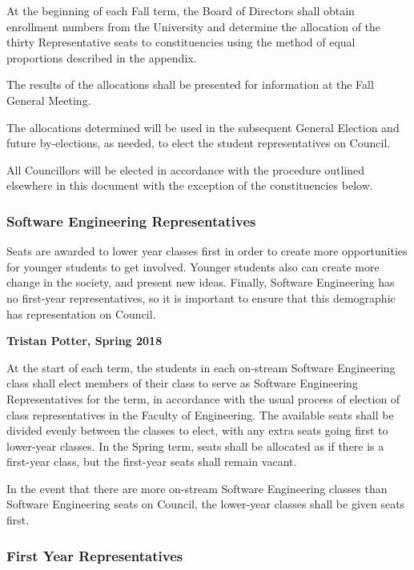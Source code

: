 At the beginning of each Fall term, the Board of Directors shall obtain 
enrollment numbers from the University and determine the allocation of the
thirty Representative seats to constituencies using the method of equal
proportions described in the appendix.

The results of the allocations shall be presented for information at the 
Fall General Meeting.

The allocations determined will be used in the subsequent General Election and
future by-elections, as needed, to elect the student representatives on
Council. 

All Councillors will be elected in accordance with the procedure outlined
elsewhere in this document with the exception of the constituencies below.

\subsubsection{Software Engineering Representatives}
\begin{annotation}
    Seats are awarded to lower year classes first in order to create more
    opportunities for younger students to get involved. Younger students also
    can create more change in the society, and present new ideas. Finally,
    Software Engineering has no first-year representatives, so it is important
    to ensure that this demographic has representation on Council.
    
    \textbf{Tristan Potter, Spring 2018}
\end{annotation}

At the start of each term, the students in each on-stream Software Engineering
class shall elect members of their class to serve as Software Engineering
Representatives for the term, in accordance with the usual process of election
of class representatives in the Faculty of Engineering. The available seats
shall be divided evenly between the classes to elect, with any extra seats going
first to lower-year classes. In the Spring term, seats shall be allocated as if
there is a first-year class, but the first-year seats shall remain vacant.

In the event that there are more on-stream Software Engineering classes than
Software Engineering seats on Council, the lower-year classes shall be given
seats first.

\subsubsection{First Year Representatives}

